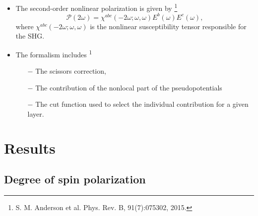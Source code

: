 \documentclass{beamer}
\begin{document}
\begin{frame}


{\small

\begin{itemize}

\item 
The second-order nonlinear polarization is given by
\footnote[frame]{\tiny S. M. Anderson et al. Phys. Rev. B, 91(7):075302, 2015.}
\begin{equation}\label{eq:shg}
\mathcal{P}(2\omega) = 
\chi^{abc}(-2\omega;\omega,\omega)E^{b}(\omega)E^{c}(\omega),
\end{equation} 
where $\chi^{abc}(-2\omega;\omega,\omega)$ is the nonlinear susceptibility
tensor responsible for the SHG.

\item 
The formalism includes\textsuperscript{ 1}
\begin{itemize}
\item [$-$] The scissors correction,
\item [$-$] The contribution of the nonlocal part of the pseudopotentials
\item [$-$] The cut function used to select the individual contribution for
a given layer.
\end{itemize}

\end{itemize}
}
\end{frame}





\section{Results}



\subsection{Degree of spin polarization}


\end{document}
